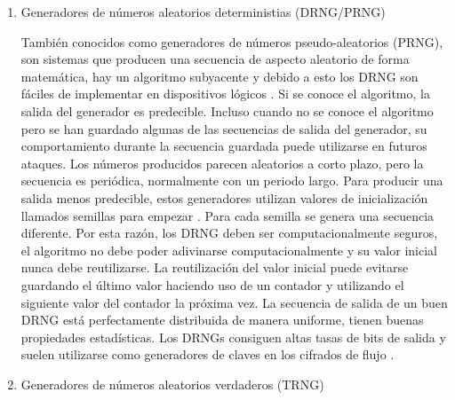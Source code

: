 	\begin{enumerate}
		\item Generadores de números aleatorios deterministias (DRNG/PRNG)
		
		También conocidos como generadores de números pseudo-aleatorios (PRNG), son sistemas que producen una secuencia de aspecto aleatorio de forma matemática, hay un algoritmo subyacente y debido a esto los DRNG son fáciles de implementar en dispositivos lógicos \cite{Jun1999}. Si se conoce el algoritmo, la salida del generador es predecible. Incluso cuando no se conoce el algoritmo pero se han guardado algunas de las secuencias de salida del generador, su comportamiento durante la secuencia guardada puede utilizarse en futuros ataques. Los números producidos parecen aleatorios a corto plazo, pero la secuencia es periódica, normalmente con un periodo largo. Para producir una salida menos predecible, estos generadores utilizan valores de inicialización llamados semillas para empezar \cite{Nist2010}. Para cada semilla se genera una secuencia diferente. Por esta razón, los DRNG deben ser computacionalmente seguros, el algoritmo no debe poder adivinarse computacionalmente y su valor inicial nunca debe reutilizarse. La reutilización del valor inicial puede evitarse guardando el último valor haciendo uso de un contador y utilizando el siguiente valor del contador la próxima vez. La secuencia de salida de un buen DRNG está perfectamente distribuida de manera uniforme, tienen buenas propiedades estadísticas. Los DRNGs consiguen altas tasas de bits de salida y suelen utilizarse como generadores de claves en los cifrados de flujo \cite{Badrignans2011}.
		
		\item Generadores de números aleatorios verdaderos (TRNG)
		

\end{enumerate}
